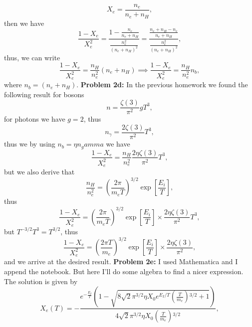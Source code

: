 \documentclass[11pt]{article}
\begin{document}
\begin{displaymath}
  X_e = \frac{n_e}{n_e+n_H}, 
\end{displaymath}
then we have
\begin{displaymath}
  \frac{1-X_e}{X_e^2} = \frac{1-\frac{n_e}{n_e+n_H}}{\frac{n_e^2}{\left(n_e+n_H\right)^2}} = \frac{\frac{n_e+n_H-n_e}{n_e+n_H}}{\frac{n_e^2}{\left(n_e+n_H\right)^2}},
\end{displaymath}
thus, we can write
\begin{displaymath}
\frac{1-X_e}{X_e^2} = \frac{n_H}{n_e^2}\left( n_e + n_H\right) \implies   \frac{1-X_e}{X_e^2} = \frac{n_H}{n_e^2}n_b,
\end{displaymath}
where $n_b = \left( n_e + n_H\right)$.
\newline
\textbf{Problem 2d:} In the previous homework we found the following result for bosons
\begin{displaymath}
  n = \frac{\zeta(3)}{\pi^2}gT^3,
\end{displaymath}
for photons we have $g=2$, thus
\begin{displaymath}
  n_\gamma = \frac{2\zeta(3)}{\pi^2}T^3,
\end{displaymath}
thus we by using $n_b = \eta n_gamma$ we have
\begin{displaymath}
  \frac{1-X_e}{X_e^2} = \frac{n_H}{n_e^2}\frac{2\eta\zeta(3)}{\pi^2}T^3,
\end{displaymath}
but we also derive that
\begin{displaymath}
  \frac{n_H}{n_e^2} = \left(\frac{2\pi }{m_e T}\right)^{3/2} \exp\left[\frac{E_i}{T}\right],
\end{displaymath}
thus
\begin{displaymath}
  \frac{1-X_e}{X_e^2} = \left(\frac{2\pi }{m_e T}\right)^{3/2} \exp\left[\frac{E_i}{T}\right]\times\frac{2\eta\zeta(3)}{\pi^2}T^3,
\end{displaymath}
but $T^{-3/2}T^3 = T^{3/2}$, thus
\begin{displaymath}
 \frac{1-X_e}{X_e^2} = \left(\frac{2\pi T}{m_e}\right)^{3/2} \exp\left[\frac{E_i}{T}\right]\times\frac{2\eta\zeta(3)}{\pi^2},
\end{displaymath}
and we arrive at the desired result.
\newline
\textbf{Problem 2e:} I used Mathematica and I append the notebook. But here I'll do some algebra to find a nicer expression. 
The solution is given by
\begin{displaymath}
X_e(T)  = -\frac{e^{-\frac{E_I}{T}} \left(1-\sqrt{8 \sqrt{2} \pi
   ^{3/2} \eta  X_0 e^{E_I/T}
   \left(\frac{T}{m_e}\right){}^{3/2}+1}\right)}{4 \sqrt{2} \pi
   ^{3/2} \eta  X_0
   \left(\frac{T}{m_e}\right){}^{3/2}},
\end{displaymath}
\end{document}
